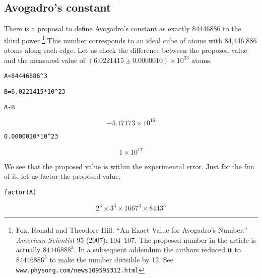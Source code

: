 \subsection{Avogadro's constant}

There is a proposal to define Avogadro's constant as exactly
84446886 to the third power.\footnote{Fox, Ronald and Theodore Hill.
``An Exact Value for Avogadro's Number.''
{\it American Scientist} 95 (2007): 104--107.
The proposed number in the article is actually $84446888^3$.
In a subsequent addendum the authors reduced it to $84446886^3$ to make the
number divisible by 12. See {\tt www.physorg.com/news109595312.html}}
This number corresponds to an ideal cube of atoms with 84,446,886
atoms along each edge.
Let us check the difference between the proposed value and the measured value
of $(6.0221415\pm0.0000010)\times10^{23}$ atoms.

\medskip
\verb$A=84446886^3$

\verb$B=6.0221415*10^23$

\verb$A-B$

$$-5.17173\times10^{16}$$

\verb$0.0000010*10^23$

$$1\times10^{17}$$

\medskip
\noindent
We see that the proposed value is within the experimental error.
Just for the fun of it, let us factor the proposed value.

\medskip
\verb$factor(A)$

$$2^3\times3^3\times1667^3\times8443^3$$

